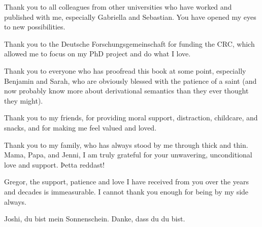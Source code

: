 Thank you to all colleagues from other universities who have worked and published with me, especially Gabriella and Sebastian. You have opened my eyes to new possibilities.  

Thank you to the Deutsche Forschungsgemeinschaft for funding the CRC, which allowed me to focus on my PhD project and do what I love. 

Thank you to everyone who has proofread this book at some point, especially Benjamin and Sarah, who are obviously blessed with the patience of a saint (and now probably know more about derivational semantics than they ever thought they might). 

Thank you to my friends, for providing moral support, distraction, childcare, and snacks, and for making me feel valued and loved. 

Thank you to my family, who has always stood by me through thick and thin. Mama, Papa, and Jenni, I am truly grateful for your unwavering, unconditional love and support. Þetta reddast!

Gregor, the support, patience and love I have received from you over the years and decades is immeasurable. I cannot thank you enough for being by my side always.

Joshi, du bist mein Sonnenschein. Danke, dass du du bist. 
